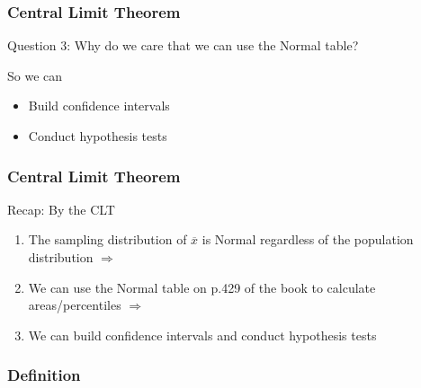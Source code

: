 \documentclass[handout]{beamer}
\newcommand{\blue}[1]{\textcolor{blue2}{#1}}
\newcommand{\xbar}{\overline{x}}
\begin{document}
\begin{frame}
\frametitle{Central Limit Theorem}
\blue{Question 3}:  Why do we care that we can use the Normal table?

\vspace{0.25cm}

\pause So we can
\begin{itemize}
\item Build confidence intervals
\item Conduct hypothesis tests
\end{itemize}

\end{frame}


\begin{frame}
\frametitle{Central Limit Theorem}
\blue{Recap}:  By the CLT

\begin{enumerate}
\item The sampling distribution of $\xbar$ is Normal \blue{regardless} of the population distribution $\Longrightarrow$
\item We can use the Normal table on p.429 of the book to calculate areas/percentiles $\Longrightarrow$
\item We can build confidence intervals and conduct hypothesis tests
\end{enumerate}


\end{frame}


\begin{frame}
\frametitle{Definition}

%
%
%
%
%
%


\end{frame}
\end{document}
